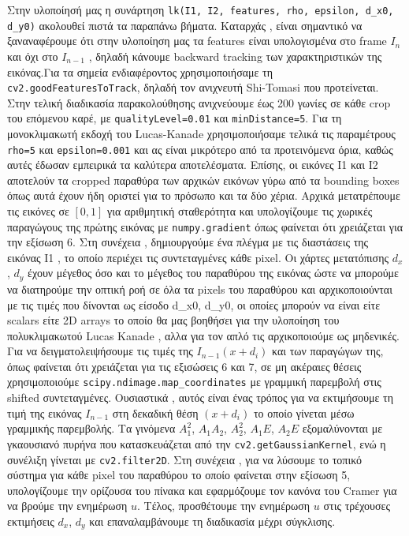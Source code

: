 \documentclass[12pt, a4paper]{article}
\begin{document}
Στην υλοποίησή μας η συνάρτηση \texttt{lk(I1, I2, features, rho, epsilon, d\_x0, d\_y0)} ακολουθεί πιστά τα παραπάνω βήματα. 
Καταρχάς , είναι σημαντικό να ξαναναφέρουμε ότι στην υλοποίηση μας τα features είναι υπολογισμένα στο frame $I_n$ και όχι στο $I_{n-1}$
, δηλαδή κάνουμε backward tracking των χαρακτηριστικών της εικόνας.Για τα σημεία ενδιαφέροντος χρησιμοποιήσαμε τη \texttt{cv2.goodFeaturesToTrack}, δηλαδή τον ανιχνευτή Shi-Tomasi που προτείνεται. Στην τελική διαδικασία παρακολούθησης ανιχνεύουμε έως 200 γωνίες σε κάθε crop του επόμενου καρέ, με \texttt{qualityLevel=0.01} και \texttt{minDistance=5}.
Για τη μονοκλιμακωτή εκδοχή του Lucas-Kanade χρησιμοποιήσαμε τελικά τις παραμέτρους \texttt{rho=5} και \texttt{epsilon=0.001} και ας είναι μικρότερο από τα προτεινόμενα όρια, καθώς αυτές έδωσαν εμπειρικά τα καλύτερα αποτελέσματα.
Επίσης, οι εικόνες Ι1 και Ι2 αποτελούν τα cropped παραθύρα των αρχικών εικόνων γύρω από τα bounding boxes όπως αυτά έχουν ήδη οριστεί για το πρόσωπο και τα δύο χέρια.
Αρχικά μετατρέπουμε τις εικόνες σε \([0,1]\) για αριθμητική σταθερότητα και υπολογίζουμε τις χωρικές παραγώγους
της πρώτης εικόνας με \texttt{numpy.gradient} όπως φαίνεται ότι χρειάζεται για την εξίσωση 6. Στη συνέχεια , δημιουργούμε ένα πλέγμα με τις διαστάσεις της εικόνας Ι1 , το οποίο περιέχει τις συντεταγμένες κάθε pixel.
Οι χάρτες μετατόπισης $d_x$, $d_y$ έχουν μέγεθος όσο και το μέγεθος του παραθύρου της εικόνας 
ώστε να μπορούμε να διατηρούμε την οπτική ροή σε όλα τα pixels του παραθύρου και αρχικοποιούνται με τις τιμές που δίνονται ως είσοδο d\_x0, d\_y0, οι οποίες μπορούν 
να είναι είτε scalars είτε 2D arrays το οποίο θα μας βοηθήσει για την υλοποίηση του πολυκλιμακωτού Lucas Kanade , αλλα για τον απλό τις αρχικοποιούμε ως μηδενικές.
Για να δειγματολειψήσουμε τις τιμές  της $I_{n-1}(x+d_i)$ και των παραγώγων της, όπως φαίνεται ότι χρειάζεται για τις εξισώσεις 6 και 7, σε μη ακέραιες θέσεις χρησιμοποιούμε \texttt{scipy.ndimage.map\_coordinates} με γραμμική παρεμβολή στις shifted συντεταγμένες.
Ουσιαστικά , αυτός είναι ένας τρόπος για να εκτιμήσουμε τη τιμή της εικόνας $I_{n-1}$ στη δεκαδική θέση $(x+d_i)$ το οποίο γίνεται μέσω γραμμικής παρεμβολής.  Τα γινόμενα $A_1^2$, $A_1A_2$, $A_2^2$, $A_1E$, $A_2E$ εξομαλύνονται με γκαουσιανό πυρήνα που κατασκευάζεται από την \texttt{cv2.getGaussianKernel}, ενώ η συνέλιξη γίνεται με \texttt{cv2.filter2D}.
Στη συνέχεια , για να λύσουμε το τοπικό σύστημα για κάθε pixel του παραθύρου το οποίο φαίνεται στην εξίσωση 5, υπολογίζουμε την ορίζουσα του πίνακα και  εφαρμόζουμε τον κανόνα του Cramer για να βρούμε την ενημέρωση $u$. Τέλος, προσθέτουμε την ενημέρωση $u$ στις τρέχουσες εκτιμήσεις $d_x$, $d_y$ και επαναλαμβάνουμε τη διαδικασία μέχρι σύγκλισης.
\end{document}
